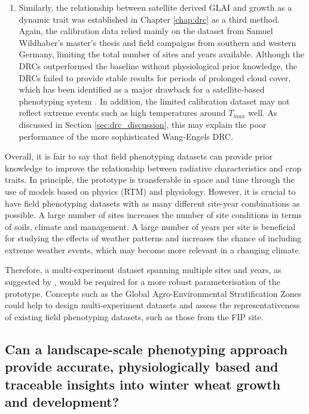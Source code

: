 \begin{enumerate}
\item Similarly, the relationship between satellite derived \gls{GLAI} and growth as a dynamic trait was established in Chapter \ref{chap:drc} as a third method. Again, the calibration data relied mainly on the dataset from Samuel Wildhaber's master's thesis and field campaigns from southern and western Germany, limiting the total number of sites and years available. Although the \gls{DRC}s outperformed the baseline without physiological prior knowledge, the \gls{DRC}s failed to provide stable results for periods of prolonged cloud cover, which has been identified as a major drawback for a satellite-based phenotyping system \citep{zhang_high-resolution_2020}. In addition, the limited calibration dataset may not reflect extreme events such as high temperatures around $T_{max}$ well. As discussed in Section \ref{sec:drc_discussion}, this may explain the poor performance of the more sophisticated Wang-Engels \gls{DRC}.

\end{enumerate}

Overall, it is fair to say that field phenotyping datasets can provide prior knowledge to improve the relationship between radiative characteristics and crop traits. In principle, the prototype is transferable in space and time through the use of models based on physics (\gls{RTM}) and physiology.
However, it is crucial to have field phenotyping datasets with as many different site-year combinations as possible. A large number of sites increases the number of site conditions in terms of soils, climate and management. A large number of years per site is beneficial for studying the effects of weather patterns and increases the chance of including extreme weather events, which may become more relevant in a changing climate.

Therefore, a multi-experiment dataset spanning multiple sites and years, as suggested by \cite{smith_scaling_2021}, would be required for a more robust parameterisation of the prototype. Concepts such as the Global Agro-Environmental Stratification Zones \cite{muecher_new_2016} could help to design multi-experiment datasets and assess the representativeness of existing field phenotyping datasets, such as those from the FIP site.

\subsection{Can a landscape-scale phenotyping approach provide accurate, physiologically based and traceable insights into winter wheat growth and development?}


